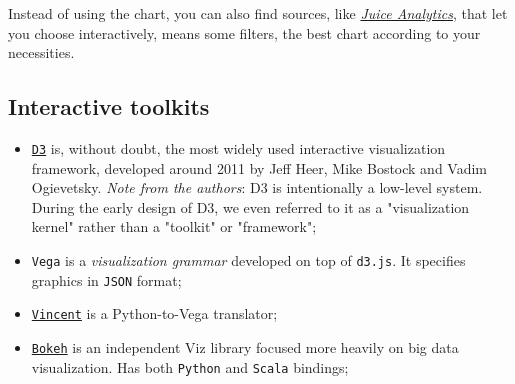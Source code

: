 Instead of using the chart, you can also find sources, like \href{http://www.juiceanalytics.com}{\emph{Juice Analytics}}, that let you choose interactively, means some filters, the best chart according to your necessities.

\subsection{Interactive toolkits}

\begin{itemize}
\item \href{https://d3js.org}{\texttt{D3}} is, without doubt, the most widely used interactive visualization framework, developed around 2011 by Jeff Heer, Mike Bostock and Vadim Ogievetsky. \emph{Note from the authors}: D3 is intentionally a low-level system. During the early design of D3, we even referred to it as a "visualization kernel" rather than a "toolkit" or "framework";

\item \texttt{Vega} is a \emph{visualization grammar} developed on top of \texttt{d3.js}. It specifies graphics in \texttt{JSON} format;

\item \href{https://vega.github.io/vega/}{\texttt{Vincent}} is a Python-to-Vega translator;

\item \href{http://bokeh.pydata.org/en/latest/}{\texttt{Bokeh}} is an independent Viz library focused more heavily on big data visualization. Has both \texttt{Python} and \texttt{Scala} bindings; 

\end{itemize}
